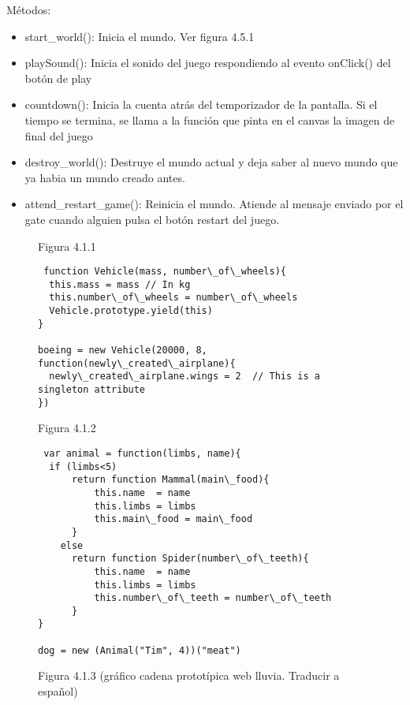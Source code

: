 Métodos:
\begin{itemize}
 \item start\_world():
Inicia el mundo. Ver figura 4.5.1

 \item playSound():
Inicia el sonido del juego respondiendo al evento onClick() del botón de play

 \item countdown():
Inicia la cuenta atrás del temporizador de la pantalla. Si el tiempo se termina, se llama a la función que pinta en el canvas la imagen de final del juego

 \item destroy\_world():
Destruye el mundo actual y deja saber al nuevo mundo que ya habia un mundo creado antes.

 \item attend\_restart\_game():
Reinicia el mundo. Atiende al mensaje enviado por el gate cuando alguien pulsa el botón restart del juego.
\end{itemize}




\begin{figure}[p]
Figura 4.1.1
\begin{verbatim}
 function Vehicle(mass, number\_of\_wheels){
  this.mass = mass // In kg 
  this.number\_of\_wheels = number\_of\_wheels
  Vehicle.prototype.yield(this)
}

boeing = new Vehicle(20000, 8, function(newly\_created\_airplane){
  newly\_created\_airplane.wings = 2  // This is a singleton attribute
})
\end{verbatim}
\end{figure}


\begin{figure}[bp]
Figura 4.1.2
\begin{verbatim}
 var animal = function(limbs, name){
  if (limbs<5)
      return function Mammal(main\_food){
          this.name  = name
          this.limbs = limbs
          this.main\_food = main\_food
      }
    else
      return function Spider(number\_of\_teeth){
          this.name  = name
          this.limbs = limbs
          this.number\_of\_teeth = number\_of\_teeth
      }
}

dog = new (Animal("Tim", 4))("meat")
\end{verbatim}
\end{figure}


\begin{figure}
Figura 4.1.3
(gráfico cadena prototípica web lluvia. Traducir a español)
\end{figure}


